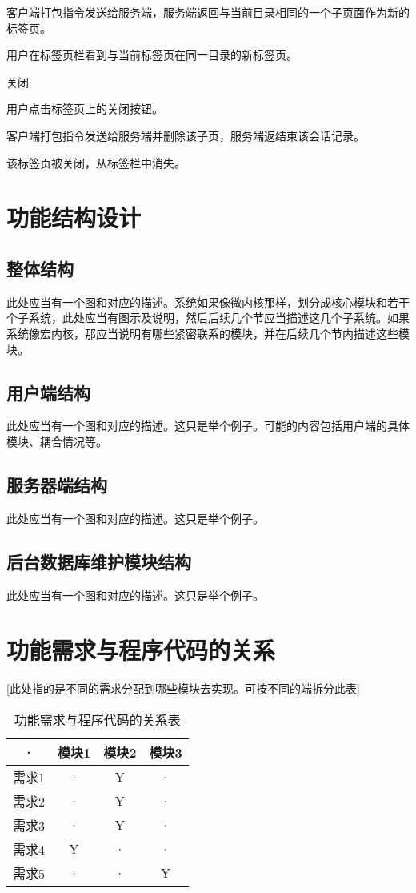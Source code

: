 客户端打包指令发送给服务端，服务端返回与当前目录相同的一个子页面作为新的标签页。

用户在标签页栏看到与当前标签页在同一目录的新标签页。

关闭:

用户点击标签页上的关闭按钮。 

客户端打包指令发送给服务端并删除该子页，服务端返结束该会话记录。

该标签页被关闭，从标签栏中消失。 

\section{功能结构设计}
\subsection{整体结构}
此处应当有一个图和对应的描述。系统如果像微内核那样，划分成核心模块和若干个子系统，此处应当有图示及说明，然后后续几个节应当描述这几个子系统。如果系统像宏内核，那应当说明有哪些紧密联系的模块，并在后续几个节内描述这些模块。

\subsection{用户端结构}
此处应当有一个图和对应的描述。这只是举个例子。可能的内容包括用户端的具体模块、耦合情况等。

\subsection{服务器端结构}
此处应当有一个图和对应的描述。这只是举个例子。

\subsection{后台数据库维护模块结构}
此处应当有一个图和对应的描述。这只是举个例子。



\section{功能需求与程序代码的关系}
[此处指的是不同的需求分配到哪些模块去实现。可按不同的端拆分此表]
\begin{table}[htbp]
\centering
\caption{功能需求与程序代码的关系表} \label{tab:requirement-module}
\begin{tabular}{|c|c|c|c|}
    \hline
    · & 模块1 & 模块2 & 模块3 \\
    \hline
    需求1 & · & Y & · \\
    \hline
    需求2 & · & Y & · \\
    \hline
    需求3 & · & Y & · \\
    \hline
    需求4 & Y & · & · \\
    \hline
    需求5 & · & · & Y \\
    \hline
\end{tabular}
\end{table}